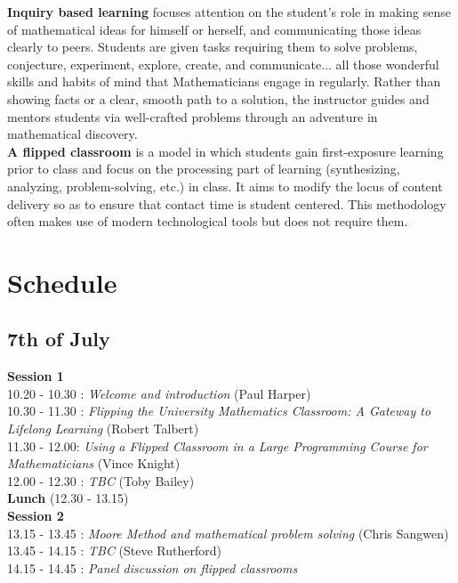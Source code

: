 \documentclass {leaflet}
\begin{document}
\vspace{1cm}

\textbf{Inquiry based learning} focuses attention on the student's role in making sense of mathematical ideas for himself or herself, and communicating those ideas clearly to peers. Students are given tasks requiring them to solve problems, conjecture, experiment, explore, create, and communicate... all those wonderful skills and habits of mind that Mathematicians engage in regularly. Rather than showing facts or a clear, smooth path to a solution, the instructor guides and mentors students via well-crafted problems through an adventure in mathematical discovery.\\

\vspace{1cm}
\textbf{A flipped classroom} is a model in which students gain first-exposure learning prior to class and focus on the processing part of learning (synthesizing, analyzing, problem-solving, etc.) in class. It aims to modify the locus of content delivery so as to ensure that contact time is student centered. This methodology often makes use of modern technological tools but does not require them.

\newpage
\section{Schedule}
\subsection{7th of July}
\vspace{1cm}

\textbf{Session 1}\\

10.20 - 10.30 : \textit{Welcome and introduction} (Paul Harper)\\
10.30 - 11.30 : \textit{Flipping the University Mathematics Classroom: A Gateway to Lifelong Learning} (Robert Talbert)\\
11.30 - 12.00: \textit{Using a Flipped Classroom in a Large Programming Course for Mathematicians} (Vince Knight)\\
12.00 - 12.30 : \textit{TBC} (Toby Bailey)\\

\textbf{Lunch} (12.30 - 13.15)\\

\textbf{Session 2}\\

13.15 - 13.45 : \textit{Moore Method and mathematical problem solving} (Chris Sangwen)\\
13.45 - 14.15 : \textit{TBC} (Steve Rutherford)\\
14.15 - 14.45 : \textit{Panel discussion on flipped classrooms}\\
\end{document}
